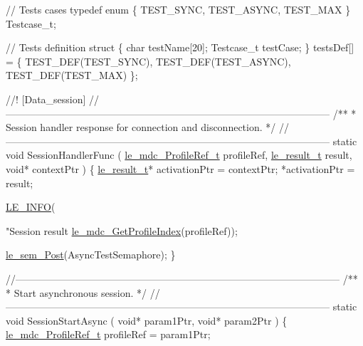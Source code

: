 \begin{DoxyCodeInclude}
\textcolor{comment}{// Tests cases}
\textcolor{keyword}{typedef} \textcolor{keyword}{enum}
\{
    TEST\_SYNC,
    TEST\_ASYNC,
    TEST\_MAX
\} Testcase\_t;

\textcolor{comment}{// Tests definition}
\textcolor{keyword}{struct}
\{
    \textcolor{keywordtype}{char} testName[20];
    Testcase\_t  testCase;
\} testsDef[] = \{
                    TEST\_DEF(TEST\_SYNC),
                    TEST\_DEF(TEST\_ASYNC),
                    TEST\_DEF(TEST\_MAX)
\};

\textcolor{comment}{}
\textcolor{comment}{//! [Data\_session]}
\textcolor{comment}{}\textcolor{comment}{//--------------------------------------------------------------------------------------------------}\textcolor{comment}{}
\textcolor{comment}{/**}
\textcolor{comment}{ * Session handler response for connection and disconnection.}
\textcolor{comment}{ */}
\textcolor{comment}{//--------------------------------------------------------------------------------------------------}
\textcolor{keyword}{static} \textcolor{keywordtype}{void} SessionHandlerFunc
(
    \hyperlink{le__mdc__interface_8h_a91074d8f0d88c6645e3085dfadf87011}{le\_mdc\_ProfileRef\_t} profileRef,
    \hyperlink{le__basics_8h_a1cca095ed6ebab24b57a636382a6c86c}{le\_result\_t} result,
    \textcolor{keywordtype}{void}* contextPtr
)
\{
    \hyperlink{le__basics_8h_a1cca095ed6ebab24b57a636382a6c86c}{le\_result\_t}* activationPtr = contextPtr;
    *activationPtr = result;

    \hyperlink{le__log_8h_a23e6d206faa64f612045d688cdde5808}{LE\_INFO}(\textcolor{stringliteral}{"Session result %
      \hyperlink{le__mdc__interface_8h_a108f7c3db74a377c2ae5482543d4e0d9}{le\_mdc\_GetProfileIndex}(profileRef));

    \hyperlink{le__semaphore_8h_abb859411cc58fbcc576c986ef52083b2}{le\_sem\_Post}(AsyncTestSemaphore);
\}

\textcolor{comment}{//--------------------------------------------------------------------------------------------------}\textcolor{comment}{}
\textcolor{comment}{/**}
\textcolor{comment}{ * Start asynchronous session.}
\textcolor{comment}{ */}
\textcolor{comment}{//--------------------------------------------------------------------------------------------------}
\textcolor{keyword}{static} \textcolor{keywordtype}{void} SessionStartAsync
(
    \textcolor{keywordtype}{void}* param1Ptr,
    \textcolor{keywordtype}{void}* param2Ptr
)
\{
    \hyperlink{le__mdc__interface_8h_a91074d8f0d88c6645e3085dfadf87011}{le\_mdc\_ProfileRef\_t} profileRef = param1Ptr;

}
\end{DoxyCodeInclude}
